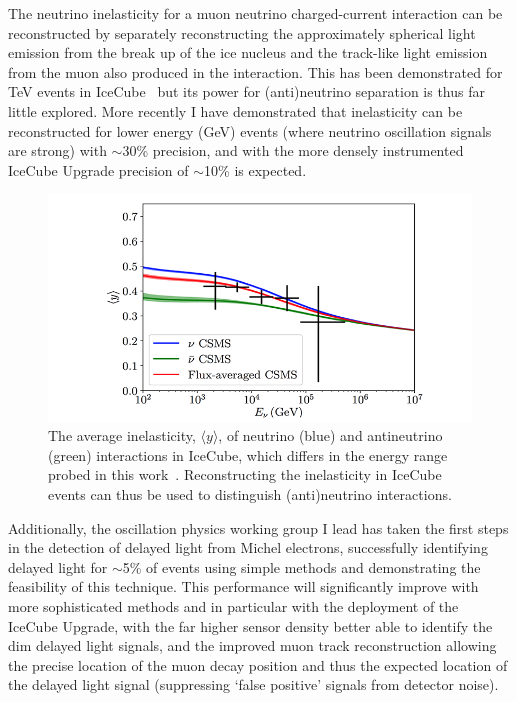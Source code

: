 \documentclass[a4paper,11pt]{article}
\begin{document}
The neutrino inelasticity for a muon neutrino charged-current interaction can be reconstructed by separately reconstructing the approximately spherical light emission from the break up of the ice nucleus and the track-like light emission from the muon also produced in the interaction. This has been demonstrated for TeV events in IceCube~\cite{Aartsen:2018vez} but its power for (anti)neutrino separation is thus far little explored. More recently I have demonstrated that inelasticity can be reconstructed for lower energy (GeV) events (where neutrino oscillation signals are strong) with $\sim$30\% precision, and with the more densely instrumented IceCube Upgrade precision of $\sim$10\% is expected. 

\begin{figure} %
    \centering
    \includegraphics[trim=2.0cm 0.0cm 1.0cm 0.0cm, clip=true, width=\linewidth]{images/inelasticity.png}
    \caption{The average inelasticity, $\langle y \rangle$, of neutrino (blue) and antineutrino (green) interactions in IceCube, which differs in the energy range probed in this work~\cite{Aartsen:2018vez}. Reconstructing the inelasticity in IceCube events can thus be used to distinguish (anti)neutrino interactions.}
    \label{fig:inelasticity}
\end{figure}

Additionally, the oscillation physics working group I lead has taken the first steps in the detection of delayed light from Michel electrons, successfully identifying delayed light for $\sim$5\% of events using simple methods and demonstrating the feasibility of this technique. This performance will significantly improve with more sophisticated methods and in particular with the deployment of the IceCube Upgrade, with the far higher sensor density better able to identify the dim delayed light signals, and the improved muon track reconstruction allowing the precise location of the muon decay position and thus the expected location of the delayed light signal (suppressing `false positive' signals from detector noise). 
\end{document}
